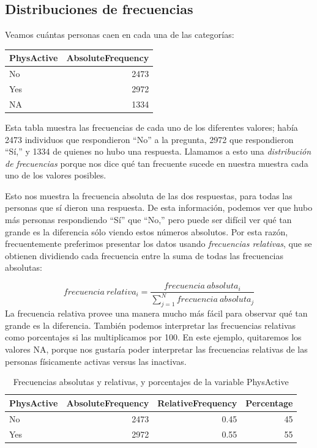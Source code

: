 \documentclass[
  12pt,
]{book}
\theoremstyle{definition}
\theoremstyle{definition}
\theoremstyle{definition}
\theoremstyle{remark}
\begin{document}
\hypertarget{frequency-distributions}{%
\subsection{Distribuciones de frecuencias}\label{frequency-distributions}}

Veamos cuántas personas caen en cada una de las categorías:

\begin{tabular}{l|r}
\hline
PhysActive & AbsoluteFrequency\\
\hline
No & 2473\\
\hline
Yes & 2972\\
\hline
NA & 1334\\
\hline
\end{tabular}

Esta tabla muestra las frecuencias de cada uno de los diferentes valores; había 2473 individuos que respondieron ``No'' a la pregunta, 2972 que respondieron ``Sí,'' y 1334 de quienes no hubo una respuesta. Llamamos a esto una \emph{distribución de frecuencias} porque nos dice qué tan frecuente sucede en nuestra muestra cada uno de los valores posibles.

Esto nos muestra la frecuencia absoluta de las dos respuestas, para todas las personas que sí dieron una respuesta. De esta información, podemos ver que hubo más personas respondiendo ``Sí'' que ``No,'' pero puede ser difícil ver qué tan grande es la diferencia sólo viendo estos números absolutos. Por esta razón, frecuentemente preferimos presentar los datos usando \emph{frecuencias relativas}, que se obtienen dividiendo cada frecuencia entre la suma de todas las frecuencias absolutas:

\[
frecuencia\ relativa_i = \frac{frecuencia\ absoluta_i}{\sum_{j=1}^N frecuencia\ absoluta_j}
\]
La frecuencia relativa provee una manera mucho más fácil para observar qué tan grande es la diferencia. También podemos interpretar las frecuencias relativas como porcentajes si las multiplicamos por 100. En este ejemplo, quitaremos los valores NA, porque nos gustaría poder interpretar las frecuencias relativas de las personas físicamente activas versus las inactivas.

\begin{table}

\caption{\label{tab:unnamed-chunk-5}Frecuencias absolutas y relativas, y porcentajes de la variable PhysActive}
\centering
\begin{tabular}[t]{l|r|r|r}
\hline
PhysActive & AbsoluteFrequency & RelativeFrequency & Percentage\\
\hline
No & 2473 & 0.45 & 45\\
\hline
Yes & 2972 & 0.55 & 55\\
\hline
\end{tabular}
\end{table}
\end{document}
